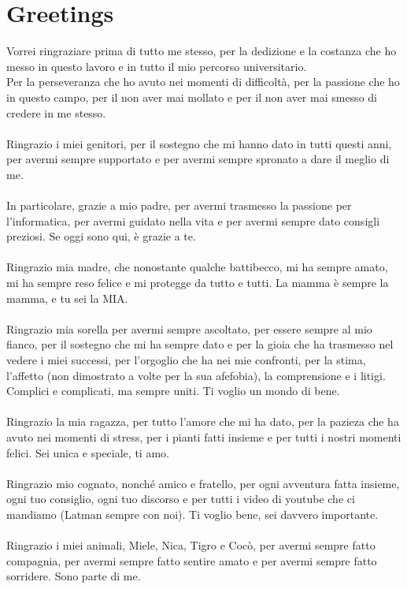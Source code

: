 \chapter*{Greetings}

Vorrei ringraziare prima di tutto me stesso, per la dedizione e la costanza che ho messo in questo lavoro e in tutto il mio percorso universitario.
\\Per la perseveranza che ho avuto nei momenti di difficoltà, per la passione che ho in questo campo, per il non aver mai mollato e per il non aver mai smesso di credere in me stesso.
\\\\Ringrazio i miei genitori, per il sostegno che mi hanno dato in tutti questi anni, per avermi sempre supportato e per avermi sempre spronato a dare il meglio di me.
\\\\In particolare, grazie a mio padre, per avermi trasmesso la passione per l'informatica, per avermi guidato nella vita e per avermi sempre dato consigli preziosi. Se oggi sono qui, è grazie a te.
\\\\Ringrazio mia madre, che nonostante qualche battibecco, mi ha sempre amato, mi ha sempre reso felice e mi protegge da tutto e tutti. La mamma è sempre la mamma, e tu sei la MIA.
\\\\Ringrazio mia sorella per avermi sempre ascoltato, per essere sempre al mio fianco, per il sostegno che mi ha sempre dato e per la gioia che ha trasmesso nel vedere i miei successi, per l'orgoglio che ha nei mie confronti, per la stima, l'affetto (non dimostrato a volte per la sua afefobia), la comprensione e i litigi.
Complici e complicati, ma sempre uniti. Ti voglio un mondo di bene.
\\\\Ringrazio la mia ragazza, per tutto l'amore che mi ha dato, per la pazieza che ha avuto nei momenti di stress, per i pianti fatti insieme e per tutti i nostri momenti felici. Sei unica e speciale, ti amo.
\\\\Ringrazio mio cognato, nonché amico e fratello, per ogni avventura fatta insieme, ogni tuo consiglio, ogni tuo discorso e per tutti i video di youtube che ci mandiamo (Latman sempre con noi). Ti voglio bene, sei davvero importante.
\\\\Ringrazio i miei animali, Miele, Nica, Tigro e Cocò, per avermi sempre fatto compagnia, per avermi sempre fatto sentire amato e per avermi sempre fatto sorridere. Sono parte di me.
